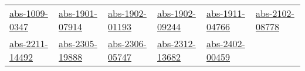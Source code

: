\begin{longtable}{*{6}{l}}
\href{../works/abs-1009-0347.pdf}{abs-1009-0347}~\cite{abs-1009-0347} & \href{../works/abs-1901-07914.pdf}{abs-1901-07914}~\cite{abs-1901-07914} & \href{../works/abs-1902-01193.pdf}{abs-1902-01193}~\cite{abs-1902-01193} & \href{../works/abs-1902-09244.pdf}{abs-1902-09244}~\cite{abs-1902-09244} & \href{../works/abs-1911-04766.pdf}{abs-1911-04766}~\cite{abs-1911-04766} & \href{../works/abs-2102-08778.pdf}{abs-2102-08778}~\cite{abs-2102-08778}\\ 
\href{../works/abs-2211-14492.pdf}{abs-2211-14492}~\cite{abs-2211-14492} & \href{../works/abs-2305-19888.pdf}{abs-2305-19888}~\cite{abs-2305-19888} & \href{../works/abs-2306-05747.pdf}{abs-2306-05747}~\cite{abs-2306-05747} & \href{../works/abs-2312-13682.pdf}{abs-2312-13682}~\cite{abs-2312-13682} & \href{../works/abs-2402-00459.pdf}{abs-2402-00459}~\cite{abs-2402-00459} & \end{longtable}

